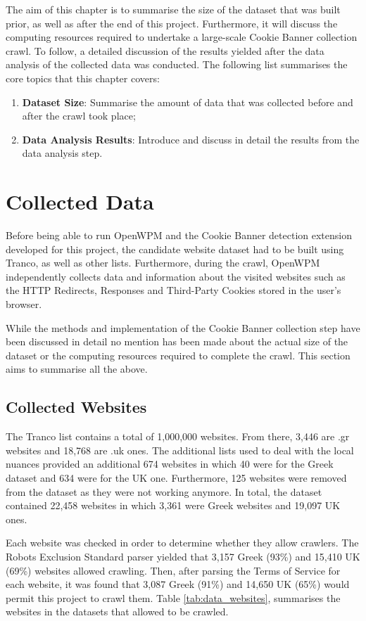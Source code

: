 \documentclass[../main.tex]{subfiles}
\begin{document}
The aim of this chapter is to summarise the size of the dataset that was built prior, as well as after the end of this project. Furthermore, it will discuss the computing resources required to undertake a large-scale Cookie Banner collection crawl. To follow, a detailed discussion of the results yielded after the data analysis of the collected data was conducted. The following list summarises the core topics that this chapter covers:

\begin{enumerate}
    \item \textbf{Dataset Size}: Summarise the amount of data that was collected before and after the crawl took place;
    \item \textbf{Data Analysis Results}: Introduce and discuss in detail the results from the data analysis step.
\end{enumerate}

\section{Collected Data}
Before being able to run OpenWPM and the Cookie Banner detection extension developed for this project, the candidate website dataset had to be built  using Tranco, as well as other lists. Furthermore, during the crawl, OpenWPM independently collects data and information about the visited websites such as the HTTP Redirects, Responses and Third-Party Cookies stored in the user’s browser.

While the methods and implementation of the Cookie Banner collection step have been discussed in detail no mention has been made about the actual size of the dataset or the computing resources required to complete the crawl. This section aims to summarise all the above.

\subsection{Collected Websites}
The Tranco list contains a total of 1,000,000 websites. From there, 3,446 are .gr websites and 18,768 are .uk ones. The additional lists used to deal with the local nuances provided an additional 674 websites in which 40 were for the Greek dataset and 634 were for the UK one. Furthermore, 125 websites were removed from the dataset as they were not working anymore. In total, the dataset contained 22,458 websites in which 3,361 were Greek websites and 19,097 UK ones. 

Each website was checked in order to determine whether they allow crawlers. The Robots Exclusion Standard parser yielded that 3,157 Greek (93\%) and 15,410 UK (69\%) websites allowed crawling. Then, after parsing the Terms of Service for each website, it was found that 3,087 Greek (91\%) and 14,650 UK (65\%) would permit this project to crawl them. Table \ref{tab:data_websites}, summarises the websites in the datasets that allowed to be crawled.
\end{document}
